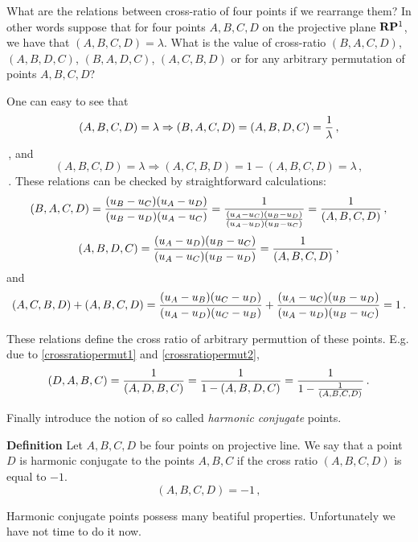 \documentclass[12pt]{article}
\numberwithin{equation}{section}
\begin{document}
 What are the relations between cross-ratio of four points
if we rearrange them? In other words suppose
that for four points $A,B,C,D$ on the projective plane
 ${\bf R}{\bf P}^1$, we have that $(A,B,C,D)=\lambda$.
  What is the value of cross-ratio 
   $(B,A,C,D)$, $(A,B,D,C)$, $(B,A,D,C)$, $(A,C,B,D)$
   or for any arbitrary permutation of points $A,B,C,D$?

  One can easy to see that 
      \begin{equation}\label{crossratiopermut1}
(A,B,C,D)=\lambda\Rightarrow     
(B,A,C,D)=(A,B,D,C)={1\over \lambda}\,,
      \end{equation}\,,
and
       \begin{equation}\label{crossratiopermut2}
(A,B,C,D)=\lambda\Rightarrow     
(A,C,B,D)=1-(A,B,C,D)=\lambda\,,
      \end{equation}\,.
 These relations can be checked 
by straightforward calculations:
              $$
  (B,A,C,D)={(u_B-u_C)(u_A-u_D)\over
             (u_B-u_D)(u_A-u_C) }
              =
        {1\over {(u_A-u_C)(u_B-u_D)\over
             (u_A-u_D)(u_B-u_C) }
                  }={1\over (A,B,C,D)}\,,
                  $$
              $$
  (A,B,D,C)={(u_A-u_D)(u_B-u_C)\over
             (u_A-u_C)(u_B-u_D) }={1\over (A,B,C,D)}\,,
             $$             
and
        $$
 (A,C,B,D)+(A,B,C,D)={(u_A-u_B)(u_C-u_D)\over
             (u_A-u_D)(u_C-u_B) }+
      {(u_A-u_C)(u_B-u_D)\over
             (u_A-u_D)(u_B-u_C) }=
      1\,.
       $$
{\footnotesize   These relations define the cross
ratio of arbitrary permuttion of these points.
 E.g. due to 
\eqref{crossratiopermut1}
and \eqref{crossratiopermut2},
     $$
(D,A,B,C)={1\over (A,D,B,C)}=
 {1\over 1-(A,B,D,C)}=
 {1\over 1-{1\over (A,B,C,D)}}\,.
      $$


} 





Finally introduce the notion of so called
{\it harmonic conjugate} points.


{\bf Definition}   Let  $A,B,C,D$ be four points
on projective line. We say that
a point $D$ is harmonic conjugate to
the points $A,B,C$  if the cross ratio $(A,B,C,D)$ 
is equal to $-1$.
      \begin{equation}\label{harmonicconjugate}
(A,B,C,D)=-1\,,
      \end{equation}
          
   Harmonic conjugate points possess many beatiful properties.
Unfortunately we have not time to do it now.
\end{document}
